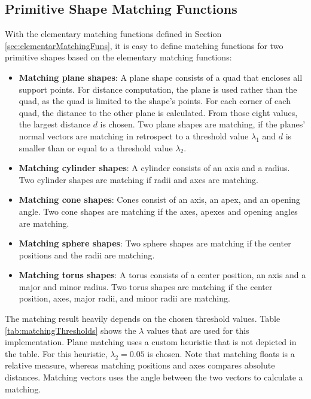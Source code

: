 \subsection{Primitive Shape Matching Functions}
\label{sec:primitiveShapeMatchingFuns}

With the elementary matching functions defined in Section \ref{sec:elementarMatchingFuns}, it is easy to define matching functions for two primitive shapes based on the elementary matching functions:
\begin{itemize}
\item \textbf{Matching plane shapes}: 
A plane shape consists of a quad that encloses all support points. For distance computation, the plane is used rather than the quad, as the quad is limited to the shape's points. For each corner of each quad, the distance to the other plane is calculated. From those eight values, the largest distance $d$ is chosen. Two plane shapes are matching, if the planes' normal vectors are matching in retrospect to a threshold value $\lambda_1$ and $d$ is smaller than or equal to a threshold value $\lambda_2$.
\item \textbf{Matching cylinder shapes}: 
A cylinder consists of an axis and a radius. Two cylinder shapes are matching if radii and axes are matching. 
\item \textbf{Matching cone shapes}:
Cones consist of an axis, an apex, and an opening angle. Two cone shapes are matching if the axes, apexes and opening angles are matching. 
\item \textbf{Matching sphere shapes}: 
Two sphere shapes are matching if the center positions and the radii are matching. 
\item \textbf{Matching torus shapes}: 
A torus consists of a center position, an axis and a major and minor radius. Two torus shapes are matching if the center position, axes, major radii, and minor radii are matching. 
\end{itemize}

The matching result heavily depends on the chosen threshold values. Table \ref{tab:matchingThresholds} shows the $\lambda$ values that are used for this implementation. Plane matching uses a custom heuristic that is not depicted in the table. For this heuristic, $\lambda_2 = 0.05$ is chosen. Note that matching floats is a relative measure, whereas matching positions and axes compares absolute distances. Matching vectors uses the angle between the two vectors to calculate a matching. 

